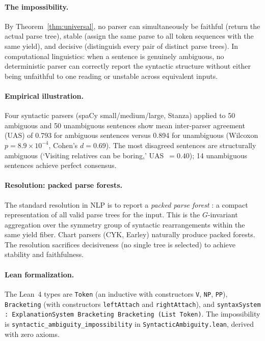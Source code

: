 \paragraph{The impossibility.}
By Theorem~\ref{thm:universal}, no parser can simultaneously be faithful
(return the actual parse tree), stable (assign the same parse to all token
sequences with the same yield), and decisive (distinguish every pair of
distinct parse trees).  In computational linguistics: when a sentence is
genuinely ambiguous, no deterministic parser can correctly report the syntactic
structure without either being unfaithful to one reading or unstable across
equivalent inputs.

\paragraph{Empirical illustration.}
Four syntactic parsers (spaCy small/medium/large, Stanza) applied to 50
ambiguous and 50 unambiguous sentences show mean inter-parser agreement (UAS) of
0.793 for ambiguous sentences versus 0.894 for unambiguous (Wilcoxon
$p = 8.9 \times 10^{-4}$, Cohen's $d = 0.69$).  The most disagreed sentences
are structurally ambiguous (`Visiting relatives can be boring,' UAS~$= 0.40$);
14 unambiguous sentences achieve perfect consensus.

\paragraph{Resolution: packed parse forests.}
The standard resolution in NLP is to report a \emph{packed parse forest}
\citep{jurafsky2024}: a compact representation of all valid parse trees for
the input.  This is the $G$-invariant aggregation over the symmetry group of
syntactic rearrangements within the same yield fiber.  Chart parsers (CYK,
Earley) naturally produce packed forests.  The resolution sacrifices
decisiveness (no single tree is selected) to achieve stability and
faithfulness.

\paragraph{Lean formalization.}
The Lean~4 types are \texttt{Token} (an inductive with constructors \texttt{V},
\texttt{NP}, \texttt{PP}), \texttt{Bracketing} (with constructors
\texttt{leftAttach} and \texttt{rightAttach}), and
\texttt{syntaxSystem : ExplanationSystem Bracketing Bracketing (List Token)}.
The impossibility is \texttt{syntactic\_ambiguity\_impossibility} in
\texttt{SyntacticAmbiguity.lean}, derived with zero axioms.
